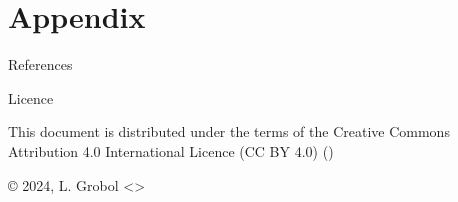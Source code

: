 \documentclass[
	xcolor={svgnames},
	aspectratio=169,
	french,
]{beamer}
\begin{document}
\hypersetup{bookmarksdepth=0}  %
\appendix
\hypersetup{bookmarksdepth=2}
\section{Appendix}

\begin{frame}[allowframebreaks]{References}
	\printbibliography[heading=none]
\end{frame}

\begin{frame}{Licence}
	\begin{english}
		\begin{center}
			{\huge \ccby}
			\vfill
			This document is distributed under the terms of the Creative Commons Attribution 4.0 International Licence (CC BY 4.0) ()

			\vfill
			© 2024, L. Grobol <>

		\end{center}
	\end{english}
\end{frame}
\end{document}
